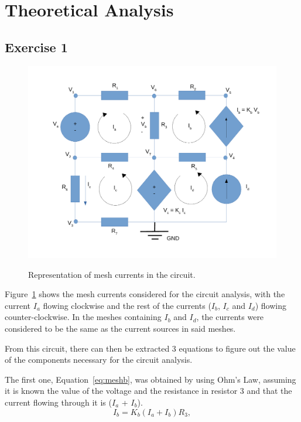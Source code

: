 \newpage
\section{Theoretical Analysis}
\label{sec:analysis}

\subsection{Exercise 1}
\label{Exercise 1}

\begin{figure}[!ht] \centering
\caption{Representation of mesh currents in the circuit.}
\includegraphics[width=0.8\linewidth]{circuit_mesh.pdf}
\label{fig:meshcurrents}
\end{figure}

Figure~\ref{fig:meshcurrents} shows the mesh currents considered for the circuit analysis, with the current $I_a$ flowing clockwise and the rest of the currents ($I_b$, $I_c$ and $I_d$) flowing counter-clockwise. In the meshes containing $I_b$ and $I_d$, the currents were considered to be the same as the current sources in said meshes.

From this circuit, there can then be extracted 3 equations to figure out the value of the components necessary for the circuit analysis.

The first one, Equation~\ref{eq:meshb}, was obtained by using Ohm's Law, assuming it is known the value of the voltage and the resistance in resistor 3 and that the current flowing through it is ($I_a$ + $I_b$).
\begin{equation}
  I_{b} = K_{b}(I_{a} + I_{b})R_{3},
  \label{eq:meshb}
\end{equation}

